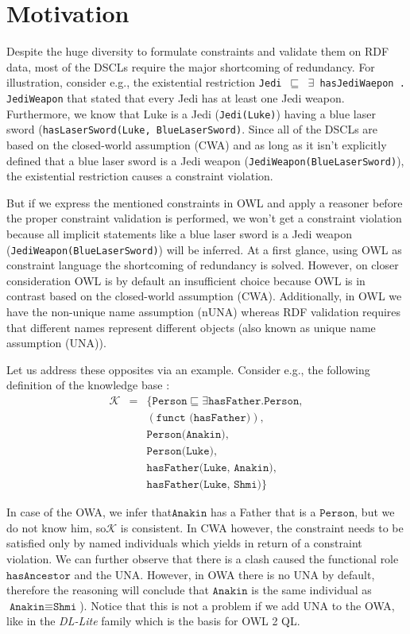 \documentclass{llncs}
\newcommand{\ms}[1]{\texttt{#1}}
\begin{document}
\section{Motivation}
Despite the huge diversity to formulate constraints and validate them on RDF data, most of the DSCLs require the major shortcoming of redundancy. For illustration, consider e.g., the existential restriction \ms{Jedi $\sqsubseteq$ $\exists$ hasJediWaepon . JediWeapon} that stated that every Jedi has at least one Jedi weapon. Furthermore, we know that Luke is a Jedi (\ms{Jedi(Luke)}) having a blue laser sword (\ms{hasLaserSword(Luke, BlueLaserSword)}. Since all of the DSCLs are based on the closed-world assumption (CWA) and as long as it isn't explicitly defined that a blue laser sword is a Jedi weapon (\ms{JediWeapon(BlueLaserSword)}), the existential restriction causes a constraint violation.

But if we express the mentioned constraints in OWL and apply a reasoner before the proper constraint validation is performed, we won't get a constraint violation because all implicit statements like a blue laser sword is a Jedi weapon (\ms{JediWeapon(BlueLaserSword)}) will be inferred. At a first glance, using OWL as constraint language the shortcoming of redundancy is solved. However, on closer consideration OWL is by default an insufficient choice because OWL is in contrast based on the closed-world assumption (CWA). Additionally, in OWL we have the non-unique name assumption (nUNA) whereas RDF validation requires that different names represent different objects (also known as unique name assumption (UNA)).

Let us address these opposites via an example. Consider e.g., the following definition of the knowledge base :
\begin{eqnarray*}
\mathcal{K} &=  & \{\ms{Person} \sqsubseteq \exists \ms{hasFather.Person}, \\
 &&(\ms{funct (hasFather)}),\\
 && \ms{Person(Anakin)},\\
 && \ms{Person(Luke)},\\
 && \ms{hasFather(Luke, Anakin)},\\ 
 && \ms{hasFather(Luke, Shmi)}\}
\end{eqnarray*}

In case of the OWA, we infer that$\ms{Anakin}$ has a Father that is a $\ms{Person}$, but we do not know him, so$\mathcal{K}$ is consistent. In CWA however, the constraint needs to be satisfied only by named individuals which yields in return of a constraint violation. We can further observe that there is a clash caused the functional role $\ms{hasAncestor}$ and the UNA. However, in OWA there is no UNA by default, therefore the reasoning will conclude that $\ms{Anakin}$ is the same individual as $\ms{Anakin} \equiv \ms{Shmi}$). Notice that this is not a problem if we add UNA to the OWA, like in the \textit{DL-Lite} family \cite{Calvanese2007,Artale2009} which is the basis for OWL 2 QL.
\end{document}
